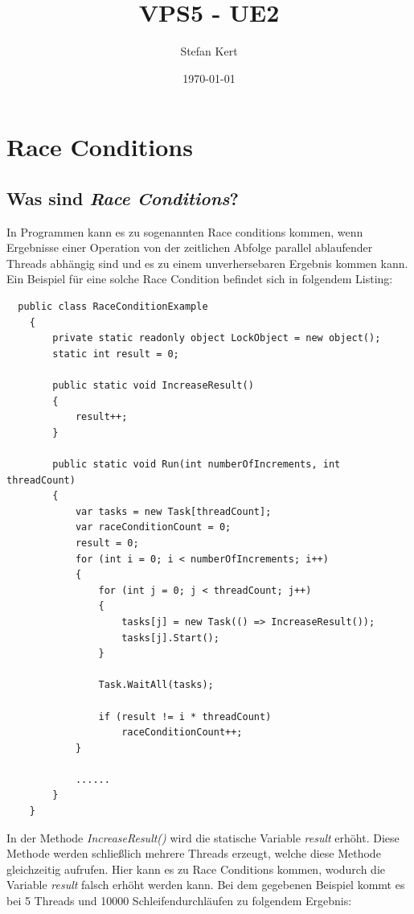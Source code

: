 \documentclass[a4paper,ngerman]{scrartcl}
\begin{document}
\title{VPS5 - UE2}
\author{Stefan Kert}
\date{\today}
\maketitle

\section{Race Conditions}
\subsection{Was sind \textit{Race Conditions}?}
In Programmen kann es zu sogenannten Race conditions kommen, wenn Ergebnisse einer Operation
von der zeitlichen Abfolge parallel ablaufender Threads abhängig sind und es zu einem unverhersebaren
Ergebnis kommen kann. Ein Beispiel für eine solche Race Condition befindet sich in folgendem Listing:

\begin{lstlisting}
  public class RaceConditionExample
    {
        private static readonly object LockObject = new object();
        static int result = 0;

        public static void IncreaseResult()
        {
            result++;
        }

        public static void Run(int numberOfIncrements, int threadCount)
        {
            var tasks = new Task[threadCount];
            var raceConditionCount = 0;
            result = 0;
            for (int i = 0; i < numberOfIncrements; i++)
            {
                for (int j = 0; j < threadCount; j++)
                {
                    tasks[j] = new Task(() => IncreaseResult());
                    tasks[j].Start();
                }

                Task.WaitAll(tasks);

                if (result != i * threadCount)
                    raceConditionCount++;
            }

            ......
        }
    }
\end{lstlisting}

In der Methode \textit{IncreaseResult()} wird die statische Variable \textit{result} erhöht. Diese 
Methode werden schließlich mehrere Threads erzeugt, welche diese Methode gleichzeitig aufrufen. Hier
kann es zu Race Conditions kommen, wodurch die Variable \textit{result} falsch erhöht werden kann. Bei dem
gegebenen Beispiel kommt es bei 5 Threads und 10000 Schleifendurchläufen zu folgendem Ergebnis:
\end{document}
